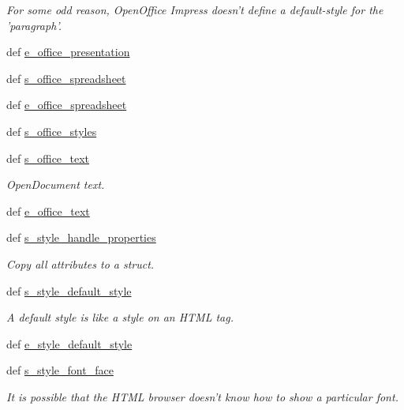 \begin{DoxyCompactItemize}
\begin{DoxyCompactList}\small\item\em For some odd reason, Open\+Office Impress doesn't define a default-\/style for the 'paragraph'. \end{DoxyCompactList}\item 
def \hyperlink{classodf_1_1odf2xhtml_1_1ODF2XHTML_aefec37ee1d0b9023ae8e5a22d6c289e1}{e\+\_\+office\+\_\+presentation}
\item 
def \hyperlink{classodf_1_1odf2xhtml_1_1ODF2XHTML_a2a3f183ccb5d2c46020aa39d2950e973}{s\+\_\+office\+\_\+spreadsheet}
\item 
def \hyperlink{classodf_1_1odf2xhtml_1_1ODF2XHTML_aa4e2c84b2e60ef07ad9880bda747a861}{e\+\_\+office\+\_\+spreadsheet}
\item 
def \hyperlink{classodf_1_1odf2xhtml_1_1ODF2XHTML_a4ba9e6cfcbb18c10a60294e4218b305c}{s\+\_\+office\+\_\+styles}
\item 
def \hyperlink{classodf_1_1odf2xhtml_1_1ODF2XHTML_a611aac2522c193741f85f6c9150ed5ed}{s\+\_\+office\+\_\+text}
\begin{DoxyCompactList}\small\item\em Open\+Document text. \end{DoxyCompactList}\item 
def \hyperlink{classodf_1_1odf2xhtml_1_1ODF2XHTML_a788f24df6fbe5fef46f54eb2e6825747}{e\+\_\+office\+\_\+text}
\item 
def \hyperlink{classodf_1_1odf2xhtml_1_1ODF2XHTML_a17102782db8830ec98ba31c997f3bfa3}{s\+\_\+style\+\_\+handle\+\_\+properties}
\begin{DoxyCompactList}\small\item\em Copy all attributes to a struct. \end{DoxyCompactList}\item 
def \hyperlink{classodf_1_1odf2xhtml_1_1ODF2XHTML_a95d3b118762f26e208304f3ed49063b1}{s\+\_\+style\+\_\+default\+\_\+style}
\begin{DoxyCompactList}\small\item\em A default style is like a style on an H\+T\+M\+L tag. \end{DoxyCompactList}\item 
def \hyperlink{classodf_1_1odf2xhtml_1_1ODF2XHTML_a79246cebb059ae5bdadabaafcdf78b63}{e\+\_\+style\+\_\+default\+\_\+style}
\item 
def \hyperlink{classodf_1_1odf2xhtml_1_1ODF2XHTML_a8561ebb0f3075536a290c6bf705ee01f}{s\+\_\+style\+\_\+font\+\_\+face}
\begin{DoxyCompactList}\small\item\em It is possible that the H\+T\+M\+L browser doesn't know how to show a particular font. \end{DoxyCompactList}\item 

\end{DoxyCompactItemize}

